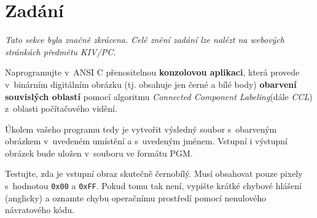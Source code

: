 \section{Zadání}

\textit{Tato sekce byla značně zkrácena. Celé znění zadání lze nalézt na webových stránkách předmětu KIV/PC.}

\vspace{0.5cm}

Naprogramujte v~ANSI C přenositelnou \textbf{konzolovou aplikaci}, která provede v~binárním digitálním obrázku
(tj. obsahuje jen černé a bílé body) \textbf{obarvení souvislých oblastí} pomocí algoritmu \textit{Connected Component
Labeling}\footnotemark (dále \textit{CCL}) z~oblasti počítačového vidění.

Úkolem vašeho programu tedy je vytvořit výsledný soubor s~obarveným obrázkem v~uvedeném
umístění a s~uvedeným jménem. Vstupní i výstupní obrázek bude uložen v~souboru ve formátu
PGM\footnotemark[\value{footnote}].

Testujte, zda je vstupní obraz skutečně černobílý. Musí obsahovat pouze pixely s~hodnotou
\verb|0x00| a \verb|0xFF|. Pokud tomu tak není, vypište krátké chybové hlášení (anglicky) a oznamte chybu
operačnímu prostředí pomocí nenulového návratového kódu.


